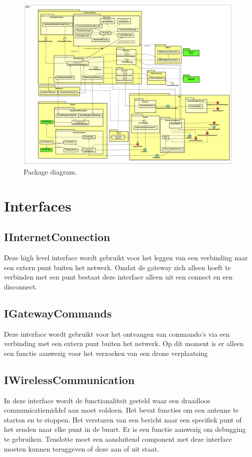 \documentclass[a4paper, 11pt, oneside]{report}
\begin{document}
\begin{landscape}
	\begin{figure}[p]%
		\includegraphics[width=.85\linewidth]{Afbeeldingen/PackageDiagram.png}%
		\caption{Package diagram.}
			\label{fig:packagediagram}
	\end{figure}%
\clearpage
\end{landscape}
\clearpage


\section{Interfaces}
\label{architectural:interfaces}
\subsection{IInternetConnection}
\label{architectural:interfaces:IInternetConnection}
Deze high level interface wordt gebruikt voor het leggen van een verbinding naar een extern punt buiten het netwerk. Omdat de gateway zich alleen hoeft te verbinden met een punt bestaat deze interface alleen uit een connect en een disconnect.
\subsection{IGatewayCommands}
\label{architectural:interfaces:IGatewayCommands}
Deze interface wordt gebruikt voor het ontvangen van commando's via een verbinding met een extern punt buiten het netwerk. Op dit moment is er alleen een functie aanwezig voor het verzoeken van een drone verplaatsing
\subsection{IWirelessCommunication}
\label{architectural:interfaces:IWirelessCommunication}
In deze interface wordt de functionaliteit gesteld waar een draadloos communicatiemiddel aan moet voldoen. Het bevat functies om een antenne te starten en te stoppen. Het versturen van een bericht naar een specifiek punt of het zenden naar elke punt in de buurt. Er is een functie aanwezig om debugging te gebruiken. Tenslotte moet een aansluitend component met deze interface moeten kunnen teruggeven of deze aan of uit staat.
\end{document}
